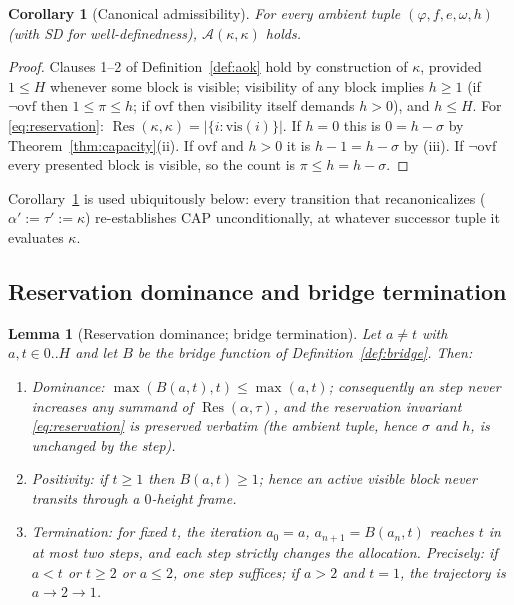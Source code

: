 \documentclass[11pt]{article}
\newcommand{\vis}{\mathrm{vis}}
\newcommand{\ovf}{\mathrm{ovf}}
\newcommand{\AOK}{\mathcal{A}}
\newcommand{\Canon}{\kappa}
\DeclareMathOperator{\Res}{Res}
\newcommand{\act}[1]{\text{\normalfont\scshape #1}}
\newtheorem{lemma}[theorem]{Lemma}
\newtheorem{corollary}[theorem]{Corollary}
\theoremstyle{definition}
\theoremstyle{remark}
\begin{document}
\begin{corollary}[Canonical admissibility]\label{cor:canon}
For every ambient tuple $(\varphi,f,e,\omega,h)$ (with \textup{SD} for
well-definedness), $\AOK(\Canon,\Canon)$ holds.
\end{corollary}

\begin{proof}
Clauses 1--2 of Definition~\ref{def:aok} hold by construction of $\Canon$,
provided $1\le H$ whenever some block is visible; visibility of any block
implies $h\ge 1$ (if $\neg\ovf$ then $1\le\pi\le h$; if $\ovf$ then
visibility itself demands $h>0$), and $h\le H$. For
\eqref{eq:reservation}: $\Res(\Canon,\Canon)=|\{i:\vis(i)\}|$. If $h=0$ this
is $0=h-\sigma$ by Theorem~\ref{thm:capacity}(ii). If $\ovf$ and $h>0$ it is
$h-1=h-\sigma$ by (iii). If $\neg\ovf$ every presented block is visible, so
the count is $\pi\le h=h-\sigma$.
\end{proof}

Corollary~\ref{cor:canon} is used ubiquitously below: every transition that
recanonicalizes ($\alpha':=\tau':=\Canon$) re-establishes CAP unconditionally,
at whatever successor tuple it evaluates $\Canon$.

\subsection{Reservation dominance and bridge termination}

\begin{lemma}[Reservation dominance; bridge termination]\label{lem:bridge}
Let $a\ne t$ with $a,t\in 0..H$ and let $B$ be the bridge function of
Definition~\ref{def:bridge}. Then:
\begin{enumerate}
\item[(i)] \emph{Dominance:} $\max(B(a,t),t)\le\max(a,t)$; consequently an
  \act{ApplyAllocation} step never increases any summand of
  $\Res(\alpha,\tau)$, and the reservation invariant \eqref{eq:reservation}
  is preserved verbatim (the ambient tuple, hence $\sigma$ and $h$, is
  unchanged by the step).
\item[(ii)] \emph{Positivity:} if $t\ge 1$ then $B(a,t)\ge 1$; hence an active
  visible block never transits through a $0$-height frame.
\item[(iii)] \emph{Termination:} for fixed $t$, the iteration
  $a_0=a$, $a_{n+1}=B(a_n,t)$ reaches $t$ in at most two steps, and each step
  strictly changes the allocation. Precisely: if $a<t$ or $t\ge 2$ or
  $a\le 2$, one step suffices; if $a>2$ and $t=1$, the trajectory is
  $a\to 2\to 1$.
\end{enumerate}
\end{lemma}
\end{document}
